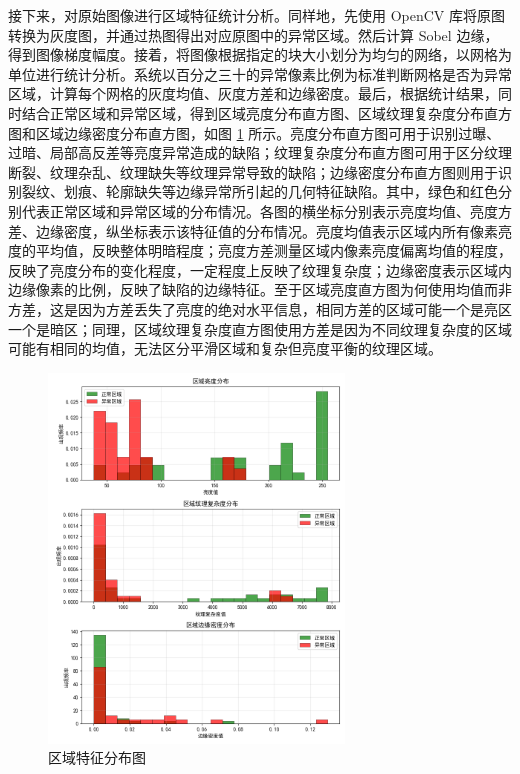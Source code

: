 \documentclass[
  ]{njuthesis}
\begin{document}
接下来，对原始图像进行区域特征统计分析。同样地，先使用 OpenCV 库将原图转换为灰度图，并通过热图得出对应原图中的异常区域。然后计算 Sobel 边缘，得到图像梯度幅度。接着，将图像根据指定的块大小划分为均匀的网络，以网格为单位进行统计分析。系统以百分之三十的异常像素比例为标准判断网格是否为异常区域，计算每个网格的灰度均值、灰度方差和边缘密度。最后，根据统计结果，同时结合正常区域和异常区域，得到区域亮度分布直方图、区域纹理复杂度分布直方图和区域边缘密度分布直方图，如图 \ref{区域特征分布图} 所示。亮度分布直方图可用于识别过曝、过暗、局部高反差等亮度异常造成的缺陷；纹理复杂度分布直方图可用于区分纹理断裂、纹理杂乱、纹理缺失等纹理异常导致的缺陷；边缘密度分布直方图则用于识别裂纹、划痕、轮廓缺失等边缘异常所引起的几何特征缺陷。其中，绿色和红色分别代表正常区域和异常区域的分布情况。各图的横坐标分别表示亮度均值、亮度方差、边缘密度，纵坐标表示该特征值的分布情况。亮度均值表示区域内所有像素亮度的平均值，反映整体明暗程度；亮度方差测量区域内像素亮度偏离均值的程度，反映了亮度分布的变化程度，一定程度上反映了纹理复杂度；边缘密度表示区域内边缘像素的比例，反映了缺陷的边缘特征。至于区域亮度直方图为何使用均值而非方差，这是因为方差丢失了亮度的绝对水平信息，相同方差的区域可能一个是亮区一个是暗区；同理，区域纹理复杂度直方图使用方差是因为不同纹理复杂度的区域可能有相同的均值，无法区分平滑区域和复杂但亮度平衡的纹理区域。

\begin{figure}[H]
    \centering
    \includegraphics[width=0.7\textwidth]{images/区域特征分布图.png}
    \caption{区域特征分布图}
    \label{区域特征分布图}
\end{figure}
\end{document}
